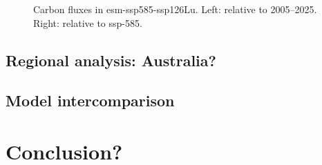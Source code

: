 \documentclass[]{article}
\begin{document}
\begin{figure}[!h]
    \centering
    \begin{subfigure}[b]{0.4\linewidth}
        
    \end{subfigure}
    \begin{subfigure}[b]{0.4\linewidth}
        
    \end{subfigure}
    \begin{subfigure}[b]{0.4\linewidth}
        
    \end{subfigure}
    \begin{subfigure}[b]{0.4\linewidth}
        
    \end{subfigure}
    \begin{subfigure}[b]{0.4\linewidth}
        
    \end{subfigure}
    \begin{subfigure}[b]{0.4\linewidth}
        
    \end{subfigure}
    \begin{subfigure}[b]{0.4\linewidth}
        
    \end{subfigure}
    \begin{subfigure}[b]{0.4\linewidth}
        
    \end{subfigure}
    \begin{subfigure}[b]{0.4\linewidth}
        
    \end{subfigure}
    \begin{subfigure}[b]{0.4\linewidth}
        
    \end{subfigure}
    \caption{Carbon fluxes in esm-ssp585-ssp126Lu.  Left: relative to 2005–2025. Right: relative to ssp-585.}
    \label{fig:cflux}
\end{figure}

\pagebreak

\subsection{Regional analysis: Australia?}


\subsection{Model intercomparison}


\section{Conclusion?}

\printbibliography
\end{document}
